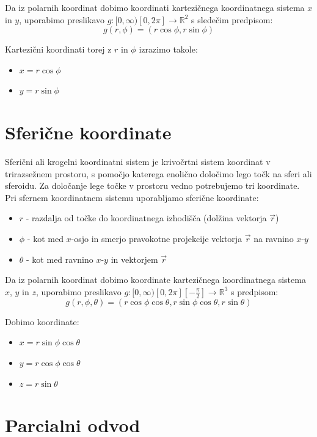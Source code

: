 \documentclass[12pt, a4paper]{article}
\begin{document}
Da iz polarnih koordinat dobimo koordinati kartezičnega koordinatnega sistema $x$ in $y$, uporabimo preslikavo $g:[ 0,\infty)    [0,2\pi]  \rightarrow  \mathbb{R}^2$ s sledečim predpisom:
$$g(r,\phi) = (r \cos \phi, r \sin \phi)$$

Kartezični koordinati torej z $r$ in $\phi$ izrazimo takole:
\begin{itemize}
\item $x=r \cos \phi$
\item $y=r \sin \phi$
\end{itemize}



\section{Sferične koordinate}

Sferični ali krogelni koordinatni sistem je krivočrtni sistem koordinat v trirazsežnem prostoru, s pomočjo katerega enolično določimo lego točk na sferi ali sferoidu. Za določanje lege točke v prostoru vedno potrebujemo tri koordinate. Pri sfernem koordinatnem sistemu uporabljamo sferične koordinate:
\begin{itemize}
\item $r$ - razdalja od točke do koordinatnega izhodišča (dolžina vektorja $\vec{r}$)
\item $\phi$ - kot med $x$-osjo in smerjo pravokotne projekcije vektorja $\vec{r}$ na ravnino $x$-$y$
\item $\theta$ - kot med ravnino $x$-$y$ in vektorjem $\vec{r}$
\end{itemize}

Da iz polarnih koordinat dobimo koordinate kartezičnega koordinatnega sistema $x$, $y$ in $z$, uporabimo preslikavo $g:  [ 0,\infty)    [0,2\pi]    [-\frac{\pi}{2}]  \rightarrow \mathbb{R}^3 $ s predpisom:
$$g(r,\phi, \theta) = (r \cos \phi \cos \theta, r \sin \phi \cos \theta, r \sin \theta)$$

Dobimo koordinate:
\begin{itemize}
\item $x=r \sin \phi \cos \theta$
\item $y=r \cos \phi  \cos \theta $
\item $z=r \sin \theta$
\end{itemize}




\section{Parcialni odvod}
\end{document}
